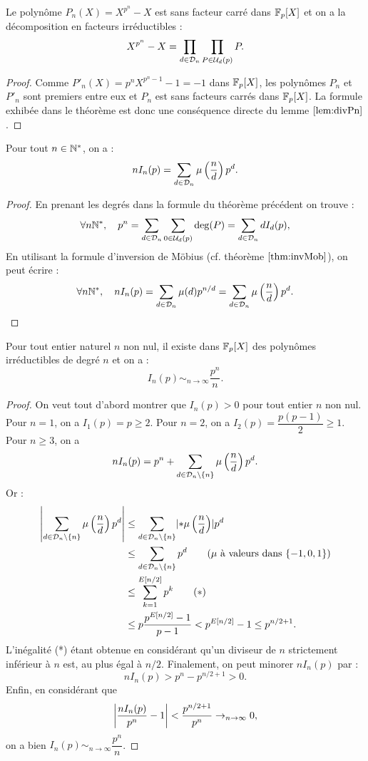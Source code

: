 \begin{thm}
Le polynôme $P_n(X) = X^{p^n} - X$ est sans facteur carré dans $\Fp[X]$ et on a la décomposition en facteurs irréductibles :
\[ X^{p^n} - X = \prod_{d \in \D_n} \prod_{P \in \U_d(p)} P . \]
\end{thm}

\begin{proof}
Comme $P'_n(X) = p^n X^{p^n-1} - 1 = - 1$ dans $\Fp[X]$, les polynômes $P_n$ et $P'_n$ sont premiers entre eux et $P_n$ est sans 
facteurs carrés dans $\Fp[X]$. 
La formule exhibée dans le théorème est donc une conséquence directe du lemme $\ref{lem:divPn}$.
\end{proof}

\begin{thm}
Pour tout $n \in \Ne$, on a : 
\[ n I_n(p) = \sum_{d \in \D_n} \mu \left ( \dfrac{n}{d} \right ) p^d . \]
\end{thm}

\begin{proof}
En prenant les degrés dans la formule du théorème précédent on trouve :
\[ \forall n \Ne, \quad p^n = \sum_{d \in \D_n} \sum_{0 \in \U_d(p)} \deg(P) = \sum_{d \in \D_n} d I_d(p) , \]
En utilisant la formule d'inversion de Möbius (cf. théorème $\ref{thm:invMob}$), on peut écrire :
\[ \forall n \Ne, \quad n I_n(p) = \sum_{d \in \D_n}  \mu(d) p^{n/d} = \sum_{d \in \D_n} \mu \left ( \dfrac{n}{d} \right ) p^d . \]
\end{proof}

\begin{coro}
Pour tout entier naturel $n$ non nul, il existe dans $\Fp[X]$ des polynômes irréductibles de degré $n$ et on a :
\[ I_n(p) \sim_{n \to \infty} \dfrac{p^n}{n} . \]
\end{coro}

\begin{proof}
On veut tout d'abord montrer que $I_n(p) > 0$ pour tout entier $n$ non nul. \\
Pour $n=1$, on a $I_1(p) = p \geq 2$. Pour $n=2$, on a $I_2(p) = \dfrac{p(p-1)}2 \geq 1$. \\
Pour $n \geq 3$, on a 
\[ n I_n(p) = p^n + \sum_{d \in \D_n \setminus \set{n}} \mu \left ( \dfrac{n}{d} \right ) p^d . \]
Or :
\begin{align*}
\abs*{  \sum_{d \in \D_n \setminus \set{n}} \mu \left ( \dfrac{n}{d} \right ) p^d } 
& \leq \sum_{d \in \D_n \setminus \set{n}} \abs{*\mu \left ( \dfrac{n}{d} \right )} p^d \\
& \leq \sum_{d \in \D_n \setminus \set{n}} p^d \qquad (\mu \text{ à valeurs dans } \set{-1,0,1}) \\
& \leq \sum_{k=1} ^{E[n/2]} p^k \qquad (*) \\
& \leq p \dfrac{p^{E[n/2]} - 1}{p-1} < p^{E[n/2]} - 1 \leq p^{n/2+1} .
\end{align*}
L'inégalité (*) étant obtenue en considérant qu'un diviseur de $n$ strictement inférieur à $n$ est, au plus égal à $n/2$. 
Finalement, on peut minorer $n I_n(p)$ par :
\[ n I_n(p) > p^n - p^{n/2+1} > 0 . \]
Enfin, en considérant que
\[ \abs*{ \dfrac{n I_n(p)}{p^n} -1 } < \dfrac{p^{n/2+1}}{p^n} \to_{n \to \infty} 0 , \]
on a bien $I_n(p) \sim_{n \to \infty} \dfrac{p^n}{n}$.
\end{proof}

